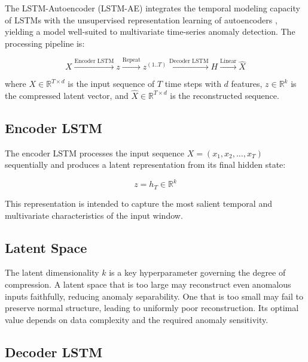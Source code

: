 The LSTM-Autoencoder (LSTM-AE) integrates the temporal modeling capacity of LSTMs with
the unsupervised representation learning of autoencoders
\cite{malhotra2015lstm, zhou2017anomaly}, yielding a model well-suited to multivariate
time-series anomaly detection. The processing pipeline is:

\begin{equation}
    X \xrightarrow{\text{Encoder LSTM}} z \xrightarrow{\text{Repeat}}
    z^{(1..T)} \xrightarrow{\text{Decoder LSTM}} H
    \xrightarrow{\text{Linear}} \hat{X}
    \label{eq:lstm_ae_pipeline}
\end{equation}

\noindent where $X \in \mathbb{R}^{T \times d}$ is the input sequence of $T$ time
steps with $d$ features, $z \in \mathbb{R}^{k}$ is the compressed latent vector, and
$\hat{X} \in \mathbb{R}^{T \times d}$ is the reconstructed sequence.

\subsection{Encoder LSTM}
\label{subsec:encoder_lstm}

The encoder LSTM processes the input sequence $X = (x_1, x_2, \ldots, x_T)$
sequentially and produces a latent representation from its final hidden state:

\begin{equation}
    z = h_T \in \mathbb{R}^{k}
\end{equation}

This representation is intended to capture the most salient temporal and multivariate
characteristics of the input window.

\subsection{Latent Space}
\label{subsec:latent_space}

The latent dimensionality $k$ is a key hyperparameter governing the degree of
compression. A latent space that is too large may reconstruct even anomalous inputs
faithfully, reducing anomaly separability. One that is too small may fail to preserve
normal structure, leading to uniformly poor reconstruction. Its optimal value depends
on data complexity and the required anomaly sensitivity.

\subsection{Decoder LSTM}
\label{subsec:decoder_lstm}

